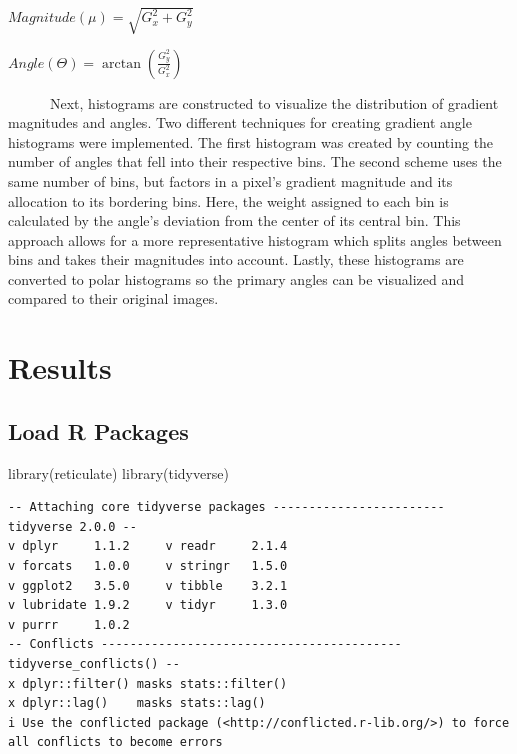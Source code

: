 \documentclass[
  letterpaper,
  DIV=11,
  numbers=noendperiod]{scrreprt}
\newenvironment{Shaded}{\begin{snugshade}}{\end{snugshade}}
\newcommand{\FunctionTok}[1]{\textcolor[rgb]{0.28,0.35,0.67}{#1}}
\newcommand{\NormalTok}[1]{\textcolor[rgb]{0.00,0.23,0.31}{#1}}
\begin{document}
\(Magnitude(\mu)=\sqrt{G_{x}^{2} + G_{y}^{2}}\)

\(Angle(\Theta)=\arctan({\frac{G_{y}^{2}}{G_{x}^{2}}})\)

\hfill\break
~~~~~~Next, histograms are constructed to visualize the distribution of
gradient magnitudes and angles. Two different techniques for creating
gradient angle histograms were implemented. The first histogram was
created by counting the number of angles that fell into their respective
bins. The second scheme uses the same number of bins, but factors in a
pixel's gradient magnitude and its allocation to its bordering bins.
Here, the weight assigned to each bin is calculated by the angle's
deviation from the center of its central bin. This approach allows for a
more representative histogram which splits angles between bins and takes
their magnitudes into account. Lastly, these histograms are converted to
polar histograms so the primary angles can be visualized and compared to
their original images.


\hypertarget{results}{%
\chapter{Results}\label{results}}

\hypertarget{load-r-packages}{%
\section{Load R Packages}\label{load-r-packages}}

\begin{Shaded}
\begin{Highlighting}[]
\FunctionTok{library}\NormalTok{(reticulate)}
\FunctionTok{library}\NormalTok{(tidyverse)}
\end{Highlighting}
\end{Shaded}

\begin{verbatim}
-- Attaching core tidyverse packages ------------------------ tidyverse 2.0.0 --
v dplyr     1.1.2     v readr     2.1.4
v forcats   1.0.0     v stringr   1.5.0
v ggplot2   3.5.0     v tibble    3.2.1
v lubridate 1.9.2     v tidyr     1.3.0
v purrr     1.0.2     
-- Conflicts ------------------------------------------ tidyverse_conflicts() --
x dplyr::filter() masks stats::filter()
x dplyr::lag()    masks stats::lag()
i Use the conflicted package (<http://conflicted.r-lib.org/>) to force all conflicts to become errors
\end{verbatim}
\end{document}
